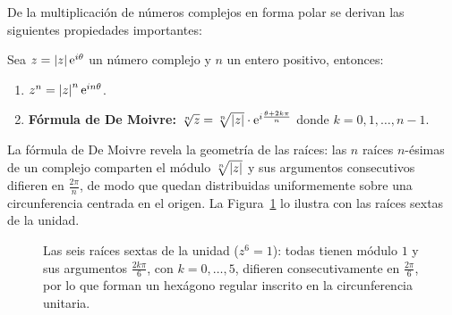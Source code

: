 De la multiplicación de números complejos en forma polar se derivan las siguientes propiedades importantes:

\begin{theorem}\label{thm:cap02:demoivre} Sea $z=\left\vert z\right\vert\mathrm{e}^{i\theta}$ un número complejo y $n$ un entero positivo, entonces:
\begin{enumerate}[$1.$]
\item $z^{n}=\left\vert z\right\vert^n\mathrm{e}^{in\theta}$.
\item \textbf{Fórmula de De Moivre:} $\sqrt[n]{z}=\sqrt[n]{\left\vert z\right\vert}\cdot \mathrm{e}^{i\frac{\theta+2k\pi}{n}}$ donde $k=0,1,\dots , n-1$.
\end{enumerate}
\end{theorem}

La fórmula de De Moivre revela la geometría de las raíces: las $n$ raíces $n$-ésimas de un complejo comparten el módulo $\sqrt[n]{\left\vert z\right\vert}$ y sus argumentos consecutivos difieren en $\frac{2\pi}{n}$, de modo que quedan distribuidas uniformemente sobre una circunferencia centrada en el origen. La Figura~\ref{fig:raices_unidad} lo ilustra con las raíces sextas de la unidad.

\begin{figure}[!htbp]
\centering
{}
\caption{Las seis raíces sextas de la unidad ($z^6=1$): todas tienen módulo $1$ y sus argumentos $\frac{2k\pi}{6}$, con $k=0,\dots,5$, difieren consecutivamente en $\frac{2\pi}{6}$, por lo que forman un hexágono regular inscrito en la circunferencia unitaria.}
\label{fig:raices_unidad}
\end{figure}



